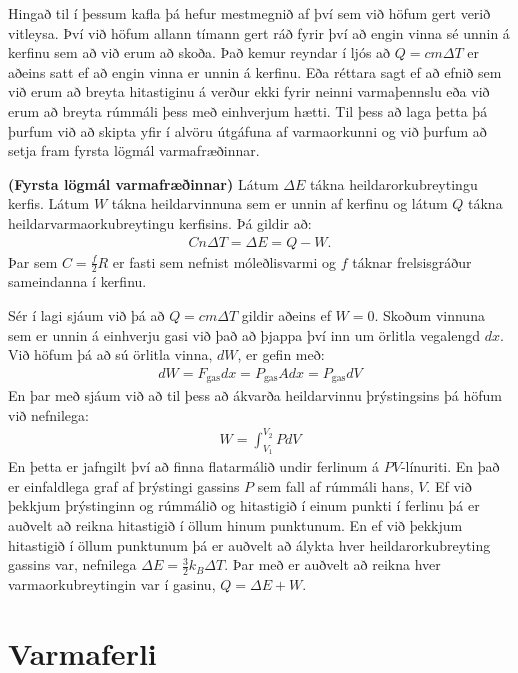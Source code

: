 Hingað til í þessum kafla þá hefur mestmegnið af því sem við höfum gert verið vitleysa. Því við höfum allann tímann gert ráð fyrir því að engin vinna sé unnin á kerfinu sem að við erum að skoða. Það kemur reyndar í ljós að $Q = cm\Delta T$ er aðeins satt ef að engin vinna er unnin á kerfinu. Eða réttara sagt ef að efnið sem við erum að breyta hitastiginu á verður ekki fyrir neinni varmaþennslu eða við erum að breyta rúmmáli þess með einhverjum hætti. Til þess að laga þetta þá þurfum við að skipta yfir í alvöru útgáfuna af varmaorkunni og við þurfum að setja fram fyrsta lögmál varmafræðinnar.
\begin{tcolorbox}
\begin{theorem}
\textbf{(Fyrsta lögmál varmafræðinnar)} Látum $\Delta E$ tákna heildarorkubreytingu kerfis. Látum $W$ tákna heildarvinnuna sem er unnin af kerfinu og látum $Q$ tákna heildarvarmaorkubreytingu kerfisins. Þá gildir að:
\begin{align*}
    C n \Delta T = \Delta E = Q - W.
\end{align*}
Þar sem $C = \frac{f}{2}R$ er fasti sem nefnist móleðlisvarmi og $f$ táknar frelsisgráður sameindanna í kerfinu.
\end{theorem}
\end{tcolorbox}

Sér í lagi sjáum við þá að $Q = cm\Delta T$ gildir aðeins ef $W = 0$. Skoðum vinnuna sem er unnin á einhverju gasi við það að þjappa því inn um örlitla vegalengd $dx$. Við höfum þá að sú örlitla vinna, $dW$, er gefin með:
\begin{align*}
    dW = F_{\text{gas}} dx = P_{\text{gas}}A dx = P_{\text{gas}} dV
\end{align*}
En þar með sjáum við að til þess að ákvarða heildarvinnu þrýstingsins þá höfum við nefnilega:
\begin{align*}
    W = \int_{V_1}^{V_2} PdV
\end{align*}
En þetta er jafngilt því að finna flatarmálið undir ferlinum á $PV$-línuriti. En það er einfaldlega graf af þrýstingi gassins $P$ sem fall af rúmmáli hans, $V$. Ef við þekkjum þrýstinginn og rúmmálið og hitastigið í einum punkti í ferlinu þá er auðvelt að reikna hitastigið í öllum hinum punktunum. En ef við þekkjum hitastigið í öllum punktunum þá er auðvelt að álykta hver heildarorkubreyting gassins var, nefnilega $\Delta E = \frac{3}{2}k_B\Delta T$. Þar með er auðvelt að reikna hver varmaorkubreytingin var í gasinu, $Q = \Delta E + W$.


\section{Varmaferli}



